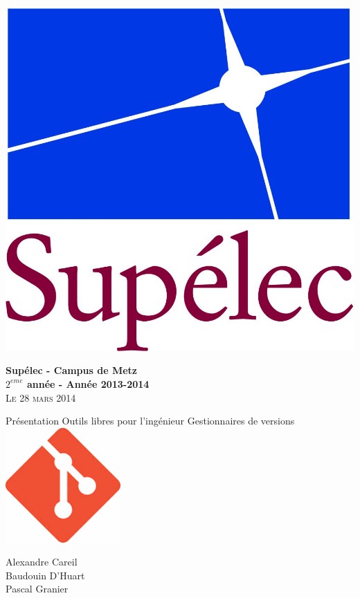 \begin{minipage}{1\textwidth}
  \centering 

  \begin{flushleft}
    \includegraphics[scale=0.3]{LogoSup.jpg}
    \newline

    \textbf{Supélec - Campus de Metz\\
      $2^{eme}$ année - Année 2013-2014}\\
    \textsc{Le 28 mars 2014}
  \end{flushleft}
  
  \vskip 5cm
  {\LARGE\textsc Présentation Outils libres pour l'ingénieur}
  \vskip 0.5cm
  {\LARGE\textsc Gestionnaires de versions}
  \vskip 3cm
  \includegraphics[scale=0.5]{images/git.png}
  \vskip 4cm

  \Large{Alexandre Careil\\
  Baudouin D'Huart\\
Pascal Granier}
\end{minipage}
